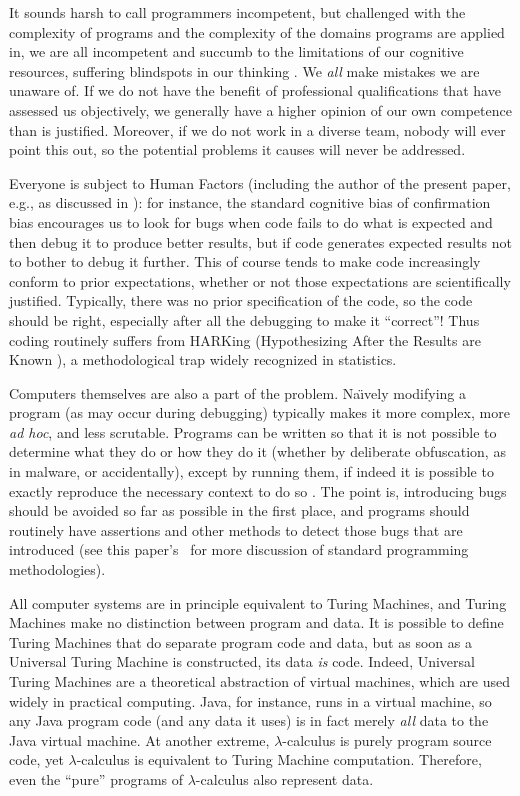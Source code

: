 \documentclass[10pt,a4paper]{article}
\begin{document}
It sounds harsh to call programmers incompetent, but challenged with the complexity of programs and the complexity of the domains programs are applied in, we are all incompetent and succumb to the limitations of our cognitive resources, suffering blindspots in our thinking \cite{fixit}. We \emph{all\/} make mistakes we are unaware of. If we do not have the benefit of professional qualifications that have assessed us objectively, we generally have a higher opinion of our own competence than is justified. Moreover, if we do not work in a diverse team, nobody will ever point this out, so the potential problems it causes will never be addressed.

{Everyone is subject to Human Factors (including the author of the present paper, e.g., as discussed in \cite{enigma}): for instance, the standard cognitive bias of confirmation bias encourages us to look for bugs when code fails to do what is expected and then debug it to produce better results, but if code generates expected results not to bother to debug it further. This of course tends to make code increasingly conform to prior expectations, whether or not those expectations are scientifically justified. Typically, there was no prior specification of the code, so the code should be right, especially after all the debugging to make it ``correct''! Thus coding routinely suffers from HARKing (Hypothesizing After the Results are Known \cite{harking}), a methodological trap widely recognized in statistics.}

Computers themselves are also a part of the problem. Na\"\i vely modifying a program (as may occur during debugging) typically makes it more complex, more \emph{ad hoc}, and less scrutable. Programs can be written so that it is not possible to determine what they do or how they do it (whether by deliberate obfuscation, as in malware, or accidentally), except by running them, if indeed it is possible to exactly reproduce the necessary context to do so \cite{framework}. The point is, introducing bugs should be avoided so far as possible in the first place, and programs should routinely have assertions and other methods to detect those bugs that are introduced (see this paper's \supplement\ for more discussion of standard programming methodologies).


All computer systems are in principle equivalent to Turing Machines, and Turing Machines make no distinction between program and data. It is possible to define Turing Machines that do separate program code and data, but as soon as a Universal Turing Machine is constructed, its data \emph{is\/} code. Indeed, Universal Turing Machines are a theoretical abstraction of virtual machines, which are used widely in practical computing. Java, for instance, runs in a virtual machine, so any Java program code (and any data it uses) is in fact merely \emph{all\/} data to the Java virtual machine. At another extreme, $\lambda$-calculus is purely program source code, yet $\lambda$-calculus is equivalent to Turing Machine computation. Therefore, even the ``pure'' programs of $\lambda$-calculus also represent data.
\end{document}
